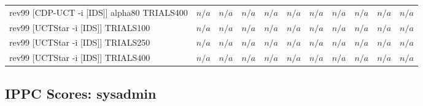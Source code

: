 \documentclass{article}
\begin{document}
\begin{tabular}{|l|r@{$\pm$}rr@{$\pm$}rr@{$\pm$}rr@{$\pm$}rr@{$\pm$}rr@{$\pm$}rr@{$\pm$}rr@{$\pm$}rr@{$\pm$}rr@{$\pm$}r|}
\\
rev99 [CDP-UCT -i [IDS]] alpha80 TRIALS400
& \multicolumn{2}{c}{\textbf{$n/a$}}
& \multicolumn{2}{c}{\textbf{$n/a$}}
& \multicolumn{2}{c}{\textbf{$n/a$}}
& \multicolumn{2}{c}{\textbf{$n/a$}}
& \multicolumn{2}{c}{\textbf{$n/a$}}
& \multicolumn{2}{c}{\textbf{$n/a$}}
& \multicolumn{2}{c}{\textbf{$n/a$}}
& \multicolumn{2}{c}{\textbf{$n/a$}}
& \multicolumn{2}{c}{\textbf{$n/a$}}
& \multicolumn{2}{c|}{\textbf{$n/a$}}
\\
rev99 [UCTStar -i [IDS]] TRIALS100
& \multicolumn{2}{c}{\textbf{$n/a$}}
& \multicolumn{2}{c}{\textbf{$n/a$}}
& \multicolumn{2}{c}{\textbf{$n/a$}}
& \multicolumn{2}{c}{\textbf{$n/a$}}
& \multicolumn{2}{c}{\textbf{$n/a$}}
& \multicolumn{2}{c}{\textbf{$n/a$}}
& \multicolumn{2}{c}{\textbf{$n/a$}}
& \multicolumn{2}{c}{\textbf{$n/a$}}
& \multicolumn{2}{c}{\textbf{$n/a$}}
& \multicolumn{2}{c|}{\textbf{$n/a$}}
\\
rev99 [UCTStar -i [IDS]] TRIALS250
& \multicolumn{2}{c}{\textbf{$n/a$}}
& \multicolumn{2}{c}{\textbf{$n/a$}}
& \multicolumn{2}{c}{\textbf{$n/a$}}
& \multicolumn{2}{c}{\textbf{$n/a$}}
& \multicolumn{2}{c}{\textbf{$n/a$}}
& \multicolumn{2}{c}{\textbf{$n/a$}}
& \multicolumn{2}{c}{\textbf{$n/a$}}
& \multicolumn{2}{c}{\textbf{$n/a$}}
& \multicolumn{2}{c}{\textbf{$n/a$}}
& \multicolumn{2}{c|}{\textbf{$n/a$}}
\\
rev99 [UCTStar -i [IDS]] TRIALS400
& \multicolumn{2}{c}{\textbf{$n/a$}}
& \multicolumn{2}{c}{\textbf{$n/a$}}
& \multicolumn{2}{c}{\textbf{$n/a$}}
& \multicolumn{2}{c}{\textbf{$n/a$}}
& \multicolumn{2}{c}{\textbf{$n/a$}}
& \multicolumn{2}{c}{\textbf{$n/a$}}
& \multicolumn{2}{c}{\textbf{$n/a$}}
& \multicolumn{2}{c}{\textbf{$n/a$}}
& \multicolumn{2}{c}{\textbf{$n/a$}}
& \multicolumn{2}{c|}{\textbf{$n/a$}}
\\
\hline
\end{tabular}%

\bigskip

\subsection*{IPPC Scores: sysadmin}
\end{document}
